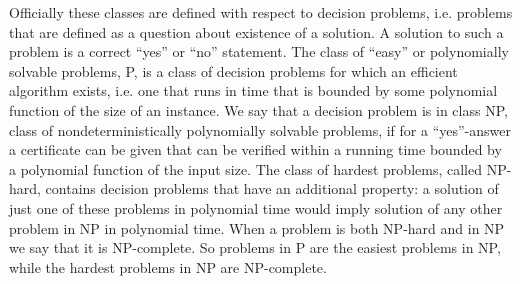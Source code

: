 {
Officially these classes are defined with respect to decision problems, i.e. problems that are defined as a question about existence of a solution. A solution to such a problem is a correct ``yes'' or ``no'' statement. The class of ``easy'' or polynomially solvable problems, P, is a class of decision problems for which an efficient algorithm exists, i.e. one that runs in time that is bounded by some polynomial function of the size of an instance. We say that a decision problem is in class NP, class of nondeterministically polynomially solvable problems, if for a ``yes''-answer a certificate can be given that can be verified within a running time bounded by a polynomial function of the input size. The class of hardest problems, called NP-hard, contains decision problems that have an additional property: a solution of just one of these problems in polynomial time would imply solution of any other problem in NP in polynomial time. When a problem is both NP-hard and in NP we say that it is NP-complete. So problems in P are the easiest problems in NP, while the hardest problems in NP are NP-complete. 
}

